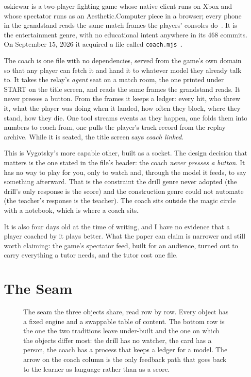 \documentclass[10pt,letterpaper,twocolumn]{article}
\newcommand{\acdot}{{\color{acpink}.}}
\newcommand{\ac}{Aesthetic{\acdot}Computer}
\newcommand{\code}[1]{\texttt{#1}}
\begin{document}
oskiewar is a two-player fighting game whose native client runs on Xbox and whose spectator runs as an \ac{} piece in a browser; every phone in the grandstand reads the same match frames the players' consoles do~\citep{scudder2026oskiewar}. It is the entertainment genre, with no educational intent anywhere in its 468 commits. On September 15, 2026 it acquired a file called \code{coach.mjs}~\citep{oskiewarcoach2026}.

The coach is one file with no dependencies, served from the game's own domain so that any player can fetch it and hand it to whatever model they already talk to. It takes the relay's \emph{agent} seat on a match room, the one printed under START on the title screen, and reads the same frames the grandstand reads. It never presses a button. From the frames it keeps a ledger: every hit, who threw it, what the player was doing when it landed, how often they block, where they stand, how they die. One tool streams events as they happen, one folds them into numbers to coach from, one pulls the player's track record from the replay archive. While it is seated, the title screen says \emph{coach linked}.

This is Vygotsky's more capable other, built as a socket. The design decision that matters is the one stated in the file's header: the coach \emph{never presses a button}. It has no way to play for you, only to watch and, through the model it feeds, to say something afterward. That is the constraint the drill genre never adopted (the drill's only response is the score) and the construction genre could not automate (the teacher's response is the teacher). The coach sits outside the magic circle~\citep{huizinga1938homo} with a notebook, which is where a coach sits.

It is also four days old at the time of writing, and I have no evidence that a player coached by it plays better. What the paper can claim is narrower and still worth claiming: the game's spectator feed, built for an audience, turned out to carry everything a tutor needs, and the tutor cost one file.

\section{The Seam}
\label{sec:seam}

\begin{figure}[t]
\centering
\resizebox{0.96\textwidth}{!}{}
\caption{The seam the three objects share, read row by row. Every object has a fixed engine and a swappable table of content. The bottom row is the one the two traditions leave under-built and the one on which the objects differ most: the drill has no watcher, the card has a person, the coach has a process that keeps a ledger for a model. The arrow on the coach column is the only feedback path that goes back to the learner as language rather than as a score.}
\label{fig:seam}
\end{figure}
\end{document}
